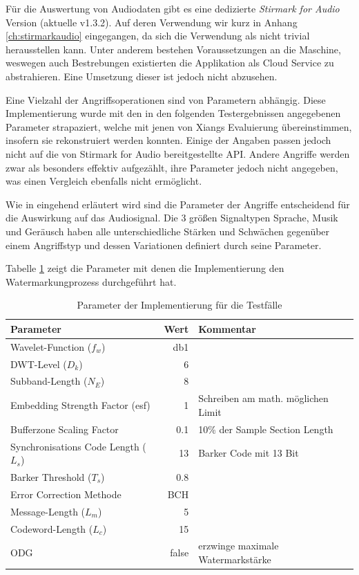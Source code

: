 Für die Auswertung von Audiodaten gibt es eine dedizierte \textit{Stirmark for Audio} Version\cite{stirmarkforaudio} (aktuelle v1.3.2). Auf deren Verwendung wir kurz in Anhang \ref{ch:stirmarkaudio} eingegangen, da sich die Verwendung als nicht trivial herausstellen kann. Unter anderem bestehen Voraussetzungen an die Maschine, weswegen auch Bestrebungen existierten die Applikation als Cloud Service zu abstrahieren\cite{petitcolas2001public}. Eine Umsetzung dieser ist jedoch nicht abzusehen. 

Eine Vielzahl der Angriffsoperationen sind von Parametern abhängig. Diese Implementierung wurde mit den in den folgenden Testergebnissen angegebenen Parameter strapaziert, welche mit jenen von Xiangs Evaluierung\cite{xiang2007robust} übereinstimmen, insofern sie rekonstruiert werden konnten. Einige der Angaben passen jedoch nicht auf die von Stirmark for Audio bereitgestellte API. Andere Angriffe werden zwar als besonders effektiv aufgezählt, ihre Parameter jedoch nicht angegeben, was einen Vergleich ebenfalls nicht ermöglicht. 

Wie in \cite{lang2004stirmark} eingehend erläutert wird sind die Parameter der Angriffe entscheidend für die Auswirkung auf das Audiosignal. Die 3 größen Signaltypen Sprache, Musik und Geräusch haben alle unterschiedliche Stärken und Schwächen gegenüber einem Angriffstyp und dessen Variationen definiert durch seine Parameter. 

Tabelle \ref{tab:algo_settings} zeigt die Parameter mit denen die Implementierung den Watermarkungprozess durchgeführt hat. 

\begin{table}[h]
\begin{tabular}{lrl}
\hline
\textbf{Parameter} 	 & \textbf{Wert} & \textbf{Kommentar} 	 \\ \hline
Wavelet-Function (${f}_{w}$)             & db1           & 	 \\
DWT-Level (${D}_{k}$) 	 & 6             & 	 \\
Subband-Length (${N}_{E}$)               & 8             & 	 \\
Embedding Strength Factor (esf)          & 1             & Schreiben am math. möglichen Limit       \\
Bufferzone Scaling Factor                & 0.1           & 10\% der Sample Section Length           \\
Synchronisations Code Length (${L}_{s}$) & 13            & Barker Code mit 13 Bit 	\\
Barker Threshold (${T}_{s}$)             & 0.8           & 	 \\
Error Correction Methode                 & BCH           & 	 \\
Message-Length (${L}_{m}$)               & 5             & 	 \\
Codeword-Length (${L}_{c}$)              & 15            & 	 \\
ODG 			 & false         & erzwinge maximale Watermarkstärke  		\\ \hline
 	 	
\end{tabular} 	
\caption{Parameter der Implementierung für die Testfälle}
\label{tab:algo_settings}
\end{table}	

